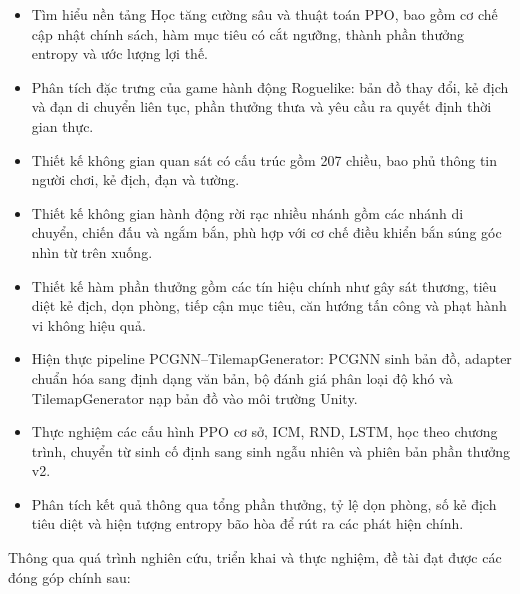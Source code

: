 \renewcommand{\labelitemi}{$-$}
\begin{itemize}
    \item Tìm hiểu nền tảng Học tăng cường sâu và thuật toán PPO, bao gồm cơ chế cập nhật chính sách, hàm mục tiêu có cắt ngưỡng, thành phần thưởng entropy và ước lượng lợi thế.
    \item Phân tích đặc trưng của game hành động Roguelike: bản đồ thay đổi, kẻ địch và đạn di chuyển liên tục, phần thưởng thưa và yêu cầu ra quyết định thời gian thực.
    \item Thiết kế không gian quan sát có cấu trúc gồm 207 chiều, bao phủ thông tin người chơi, kẻ địch, đạn và tường.
    \item Thiết kế không gian hành động rời rạc nhiều nhánh gồm các nhánh di chuyển, chiến đấu và ngắm bắn, phù hợp với cơ chế điều khiển bắn súng góc nhìn từ trên xuống.
    \item Thiết kế hàm phần thưởng gồm các tín hiệu chính như gây sát thương, tiêu diệt kẻ địch, dọn phòng, tiếp cận mục tiêu, căn hướng tấn công và phạt hành vi không hiệu quả.
    \item Hiện thực pipeline PCGNN--TilemapGenerator: PCGNN sinh bản đồ, adapter chuẩn hóa sang định dạng văn bản, bộ đánh giá phân loại độ khó và TilemapGenerator nạp bản đồ vào môi trường Unity.
    \item Thực nghiệm các cấu hình PPO cơ sở, ICM, RND, LSTM, học theo chương trình, chuyển từ sinh cố định sang sinh ngẫu nhiên và phiên bản phần thưởng v2.
    \item Phân tích kết quả thông qua tổng phần thưởng, tỷ lệ dọn phòng, số kẻ địch tiêu diệt và hiện tượng entropy bão hòa để rút ra các phát hiện chính.
\end{itemize}

\vspace{0.3cm}


Thông qua quá trình nghiên cứu, triển khai và thực nghiệm, đề tài đạt được các đóng góp chính sau:

